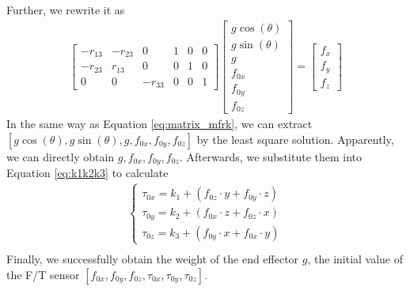 Further, we rewrite it as 
\begin{equation}
\begin{split}
\begin{bmatrix}
-r_{13}		&-r_{23} 	&0			&1		&0		&0\\
-r_{23}		&r_{13}		&0			&0		&1		&0\\
0			&0			&-r_{33}	&0		&0		&1
\end{bmatrix}
\begin{bmatrix}
g\cos(\theta)\\
g\sin(\theta)\\
g\\
f_{0x}\\
f_{0y}\\
f_{0z}
\end{bmatrix}
=
\begin{bmatrix}
f_x\\
f_y\\
f_z
\end{bmatrix}
\end{split}
\end{equation}
In the same way as Equation \ref{eq:matrix_mfrk}, we can extract $[g\cos(\theta),g\sin(\theta),g,f_{0x},f_{0y},f_{0z}]$ by the least square solution. Apparently, we can directly obtain $g,f_{0x},f_{0y},f_{0z}$. Afterwards, we substitute them into Equation \ref{eq:k1k2k3} to calculate 
\begin{equation}
\begin{split}
\left\{\begin{matrix}
\tau _{0x}	=	k_1	+ \left( f_{0z} \cdot y + f_{0y} \cdot z \right) \\
\tau _{0y} 	=	k_2	+ \left( f_{0x} \cdot z + f_{0z} \cdot x \right) \\
\tau _{0z} 	=	k_3 + \left( f_{0y} \cdot x + f_{0x} \cdot y \right)
\end{matrix}\right.\\
\end{split}
\end{equation}
Finally, we successfully obtain the weight of the end effector $g$, the initial value of the F/T sensor $[f_{0x},f_{0y},f_{0z},\tau_{0x},\tau_{0y},\tau_{0z}]$.

